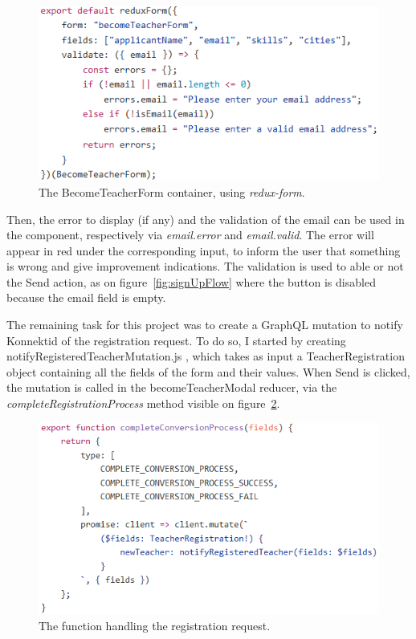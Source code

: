  \begin{figure}[H]
    \centering
    \includegraphics{figure/reduxForm.png}
    \caption{The \guillemotleft{} BecomeTeacherForm \guillemotright{} container, using \textit{redux-form}.}
    \label{fig:reduxForm}
\end{figure}

Then, the error to display (if any) and the validation of the email can be used in the component, respectively via \textit{email.error} and \textit{email.valid}. The error will appear in red under the corresponding input, to inform the user that something is wrong and give improvement indications. The validation is used to able or not the \guillemotleft{} Send \guillemotright{} action, as on {\sc figure}~\ref{fig:signUpFlow} where the button is disabled because the email field is empty.

The remaining task for this project was to create a GraphQL mutation to notify Konnektid of the registration request. To do so, I started by creating \guillemotleft{} notifyRegisteredTeacherMutation.js \guillemotright{}, which takes as input a \guillemotleft{} TeacherRegistration \guillemotright{} object containing all the fields of the form and their values. When \guillemotleft{} Send \guillemotright{} is clicked, the mutation is called in the \guillemotleft{} becomeTeacherModal \guillemotright{} reducer, via the \textit{completeRegistrationProcess} method visible on {\sc figure}~\ref{fig:completeRegistration}.

 \begin{figure}[H]
    \centering
    \includegraphics{figure/completeRegistration.png}
    \caption{The function handling the registration request.}
    \label{fig:completeRegistration}
\end{figure}


